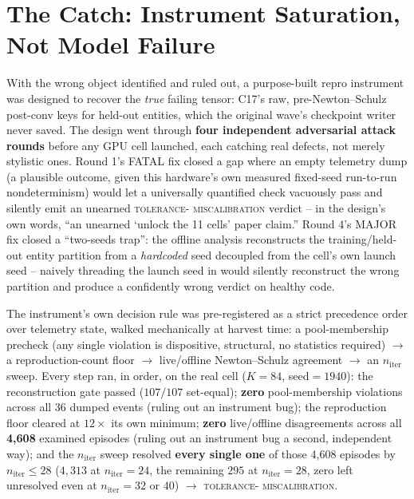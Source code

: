 \documentclass[10pt,letterpaper]{article}
\newcommand{\niter}{n_{\mathrm{iter}}}
\begin{document}
\section{The Catch: Instrument Saturation, Not Model Failure}
\label{sec:catch}

With the wrong object identified and ruled out, a purpose-built repro
instrument was designed to recover the \emph{true} failing tensor: C17's
raw, pre-Newton--Schulz post-conv keys for held-out entities, which the
original wave's checkpoint writer never saved. The design went through
\textbf{four independent adversarial attack rounds} before any GPU cell
launched, each catching real defects, not merely stylistic ones.
Round 1's FATAL fix closed a gap where an empty telemetry dump (a
plausible outcome, given this hardware's own measured fixed-seed
run-to-run nondeterminism) would let a universally quantified check
vacuously pass and silently emit an unearned \textsc{tolerance-
miscalibration} verdict -- in the design's own words, ``an unearned
`unlock the 11 cells' paper claim.''
Round 4's MAJOR fix closed a ``two-seeds trap'': the offline analysis
reconstructs the training/held-out entity partition from a
\emph{hardcoded} seed decoupled from the cell's own launch seed --
naively threading the launch seed in would silently reconstruct the
wrong partition and produce a confidently wrong verdict on healthy code.

The instrument's own decision rule was pre-registered as a strict
precedence order over telemetry state, walked mechanically at harvest
time: a pool-membership precheck (any single violation is dispositive,
structural, no statistics required) $\to$ a reproduction-count floor
$\to$ live/offline Newton--Schulz agreement $\to$ an $\niter$ sweep. Every
step ran, in order, on the real cell ($K{=}84$, seed$=1940$): the
reconstruction gate passed ($107/107$ set-equal); \textbf{zero}
pool-membership violations across all 36 dumped events (ruling out an
instrument bug); the reproduction floor cleared at $12\times$ its own
minimum; \textbf{zero} live/offline disagreements across all
\textbf{4{,}608} examined episodes (ruling out an instrument bug a
second, independent way); and the $\niter$ sweep resolved
\textbf{every single one} of those 4{,}608 episodes by $\niter\le28$
($4{,}313$ at $\niter=24$, the remaining $295$ at $\niter=28$, zero left
unresolved even at $\niter=32$ or $40$) $\to$ \textsc{tolerance-
miscalibration}.
\end{document}
